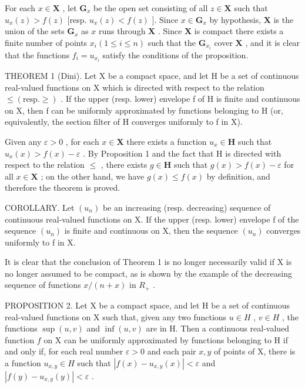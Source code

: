 For each \(x \in \mathbf{X}\) , let \(\mathbf{G}_x\) be the open set consisting of all \(z \in \mathbf{X}\) such that \(u_x(z) > f(z)\) {[}resp. \(u_x(z) < f(z)\) {]}. Since \(x \in \mathbf{G}_x\) by hypothesis, \(\mathbf{X}\) is the union of the sets \(\mathbf{G}_x\) as \(x\) runs through \(\mathbf{X}\) . Since \(\mathbf{X}\) is compact there exists a finite number of points \(x_i (1 \leqslant i \leqslant n)\) such that the \(\mathbf{G}_{x_i}\) cover \(\mathbf{X}\) , and it is clear that the functions \(f_i = u_{x_i}\) satisfy the conditions of the proposition.

THEOREM 1 (Dini). Let X be a compact space, and let H be a set of continuous real-valued functions on X which is directed with respect to the relation \(\leqslant (\text{resp.} \geqslant)\) . If the upper (resp. lower) envelope f of H is finite and continuous on X, then f can be uniformly approximated by functions belonging to H (or, equivalently, the section filter of H converges uniformly to f in X).

Given any \(\varepsilon > 0\) , for each \(x \in \mathbf{X}\) there exists a function \(u_x \in \mathbf{H}\) such that \(u_x(x) > f(x) - \varepsilon\) . By Proposition 1 and the fact that H is directed with respect to the relation \(\leqslant\) , there exists \(g \in \mathbf{H}\) such that \(g(x) > f(x) - \varepsilon\) for all \(x \in \mathbf{X}\) ; on the other hand, we have \(g(x) \leqslant f(x)\) by definition, and therefore the theorem is proved.

COROLLARY. Let \((u_{n})\) be an increasing (resp. decreasing) sequence of continuous real-valued functions on X. If the upper (resp. lower) envelope f of the sequence \((u_{n})\) is finite and continuous on X, then the sequence \((u_{n})\) converges uniformly to f in X.

It is clear that the conclusion of Theorem 1 is no longer necessarily valid if X is no longer assumed to be compact, as is shown by the example of the decreasing sequence of functions \(x/(n+x)\) in \(R_{+}\) .

PROPOSITION 2. Let X be a compact space, and let H be a set of continuous real-valued functions on X such that, given any two functions \(u \in H\) , \(v \in H\) , the functions \(\sup(u, v)\) and \(\inf(u, v)\) are in H. Then a continuous real-valued function \(f\) on X can be uniformly approximated by functions belonging to H if and only if, for each real number \(\varepsilon > 0\) and each pair \(x, y\) of points of X, there is a function \(u_{x,y} \in H\) such that \(|f(x) - u_{x,y}(x)| < \varepsilon\) and \(|f(y) - u_{x,y}(y)| < \varepsilon\) .


